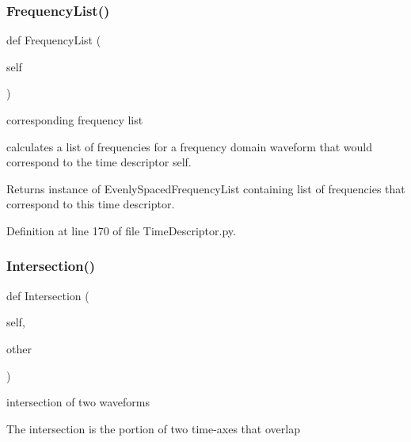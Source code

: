 \subsubsection{\texorpdfstring{Frequency\+List()}{FrequencyList()}}
{\footnotesize\ttfamily def Frequency\+List (\begin{DoxyParamCaption}\item[{}]{self }\end{DoxyParamCaption})}



corresponding frequency list 

calculates a list of frequencies for a frequency domain waveform that would correspond to the time descriptor self.

\begin{DoxyReturn}{Returns}
instance of Evenly\+Spaced\+Frequency\+List containing list of frequencies that correspond to this time descriptor. 
\end{DoxyReturn}


Definition at line 170 of file Time\+Descriptor.\+py.

\mbox{\label{classSignalIntegrity_1_1TimeDomain_1_1Waveform_1_1TimeDescriptor_1_1TimeDescriptor_a4035abdb0ca1b8258580a359f573e55a}} 
\subsubsection{\texorpdfstring{Intersection()}{Intersection()}}
{\footnotesize\ttfamily def Intersection (\begin{DoxyParamCaption}\item[{}]{self,  }\item[{}]{other }\end{DoxyParamCaption})}



intersection of two waveforms 

The intersection is the portion of two time-\/axes that overlap


